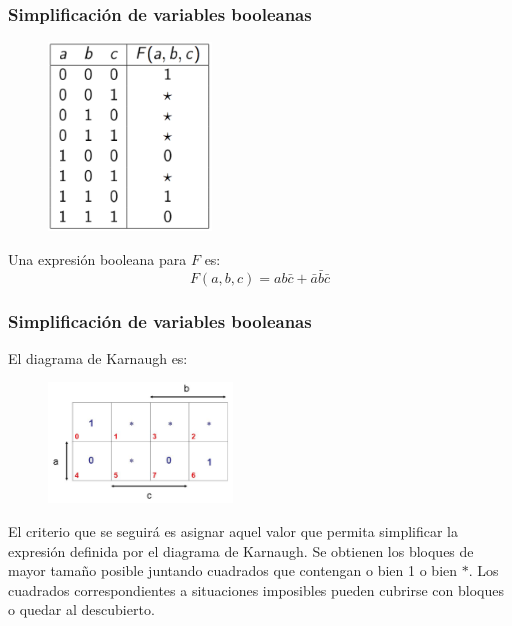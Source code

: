 \documentclass{beamer}
\begin{document}
\begin{frame}
\frametitle{Simplificaci\'on de variables booleanas}
 \begin{figure}[h]
  \label{fig:volumen}
\centering
\includegraphics[height=5cm]{k10}
\end{figure}
Una expresi\'on booleana para $F$ es:
\[F(a,b,c) = ab\bar c + \bar a\bar b\bar c\]
\end{frame}



\begin{frame}
\frametitle{Simplificaci\'on de variables booleanas}
El diagrama de Karnaugh es:
 \begin{figure}[h]
  \label{fig:volumen}
\centering
\includegraphics[height=3.2cm]{k11}
\end{figure}
El criterio que se seguir\'a es asignar aquel valor que permita simplificar la expresi\'on definida por el diagrama de Karnaugh. Se obtienen los bloques de mayor tama\~no posible juntando cuadrados que contengan o bien 1 o bien $*$. Los cuadrados correspondientes a situaciones imposibles pueden cubrirse con bloques o quedar al descubierto.
\end{frame}
\end{document}

